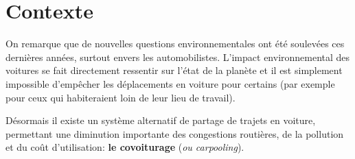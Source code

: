 \section{Contexte}

On remarque que de nouvelles questions environnementales ont été soulevées ces dernières années, surtout envers les automobilistes. L'impact environnemental des voitures se fait directement ressentir sur l'état de la planète et il est simplement impossible d'empêcher les déplacements en voiture pour certains (par exemple pour ceux qui habiteraient loin de leur lieu de travail).

Désormais il existe un système alternatif de partage de trajets en voiture, permettant une diminution importante des congestions routières, de la pollution et du coût d'utilisation: \textbf{le covoiturage} (\textit{ou carpooling}).